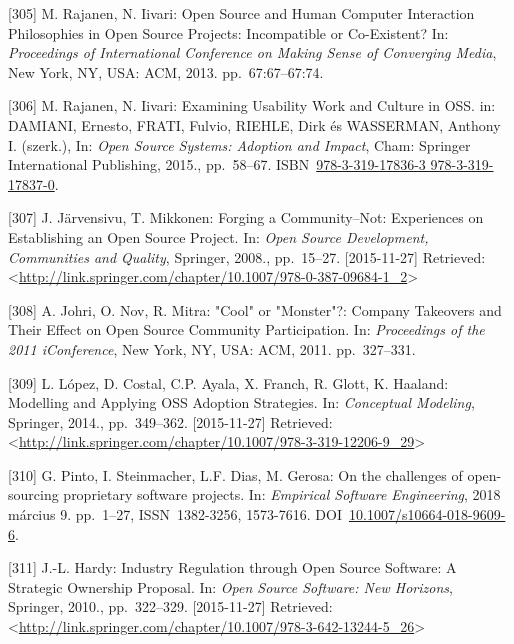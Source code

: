 \documentclass[12pt,magyar,a4paper,oneside]{scrreprt}
\begin{document}
\leavevmode\hypertarget{ref-rajanen_open_2013}{}%
{[}305{]} M. Rajanen, N. Iivari: Open Source and Human Computer
Interaction Philosophies in Open Source Projects: Incompatible or
Co-Existent? In: \emph{Proceedings of International Conference on Making
Sense of Converging Media}, New York, NY, USA: ACM, 2013.
pp.~67:67--67:74.

\leavevmode\hypertarget{ref-damiani_examining_2015}{}%
{[}306{]} M. Rajanen, N. Iivari: Examining Usability Work and Culture in
OSS. in: DAMIANI, Ernesto, FRATI, Fulvio, RIEHLE, Dirk és WASSERMAN,
Anthony I. (szerk.), In: \emph{Open Source Systems: Adoption and
Impact}, Cham: Springer International Publishing, 2015., pp.~58--67.
ISBN~\href{https://worldcat.org/isbn/978-3-319-17836-3\%20978-3-319-17837-0}{978-3-319-17836-3 978-3-319-17837-0}.

\leavevmode\hypertarget{ref-jarvensivu_forging_2008}{}%
{[}307{]} J. Järvensivu, T. Mikkonen: Forging a Community--Not:
Experiences on Establishing an Open Source Project. In: \emph{Open
Source Development, Communities and Quality}, Springer, 2008.,
pp.~15--27. {[}2015-11-27{]} Retrieved:
\textless{}\url{http://link.springer.com/chapter/10.1007/978-0-387-09684-1_2}\textgreater{}

\leavevmode\hypertarget{ref-johri_cool_2011}{}%
{[}308{]} A. Johri, O. Nov, R. Mitra: "Cool" or "Monster"?: Company
Takeovers and Their Effect on Open Source Community Participation. In:
\emph{Proceedings of the 2011 iConference}, New York, NY, USA: ACM,
2011. pp.~327--331.

\leavevmode\hypertarget{ref-lopez_modelling_2014}{}%
{[}309{]} L. López, D. Costal, C.P. Ayala, X. Franch, R. Glott, K.
Haaland: Modelling and Applying OSS Adoption Strategies. In:
\emph{Conceptual Modeling}, Springer, 2014., pp.~349--362.
{[}2015-11-27{]} Retrieved:
\textless{}\url{http://link.springer.com/chapter/10.1007/978-3-319-12206-9_29}\textgreater{}

\leavevmode\hypertarget{ref-pinto_challenges_2018}{}%
{[}310{]} G. Pinto, I. Steinmacher, L.F. Dias, M. Gerosa: On the
challenges of open-sourcing proprietary software projects. In:
\emph{Empirical Software Engineering}, 2018 március 9. pp.~1--27,
ISSN~1382-3256, 1573-7616.
DOI~\href{https://doi.org/10.1007/s10664-018-9609-6}{10.1007/s10664-018-9609-6}.

\leavevmode\hypertarget{ref-hardy_industry_2010}{}%
{[}311{]} J.-L. Hardy: Industry Regulation through Open Source Software:
A Strategic Ownership Proposal. In: \emph{Open Source Software: New
Horizons}, Springer, 2010., pp.~322--329. {[}2015-11-27{]} Retrieved:
\textless{}\url{http://link.springer.com/chapter/10.1007/978-3-642-13244-5_26}\textgreater{}
\end{document}
